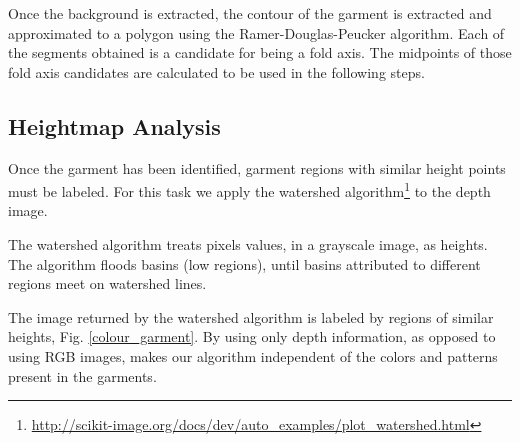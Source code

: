 Once the background is extracted, the contour of the garment is extracted and approximated to a polygon using the Ramer-Douglas-Peucker algorithm. Each of the segments obtained is a candidate for being a fold axis. The midpoints of those fold axis candidates are calculated to be used in the following steps.


\subsection{Heightmap Analysis}

Once the garment has been identified, garment regions with similar height points must be labeled. For this task we apply the watershed algorithm\footnote{\url{http://scikit-image.org/docs/dev/auto_examples/plot_watershed.html}} to the depth image. 

The watershed algorithm treats pixels values, in a grayscale image, as heights. The algorithm floods basins (low regions), until basins attributed to different regions meet on watershed lines. 

%
%

The image returned by the watershed algorithm is labeled by regions of similar heights, Fig. \ref{colour_garment}. By using only depth information, as opposed to using RGB images, makes our algorithm independent of the colors and patterns present in the garments.

